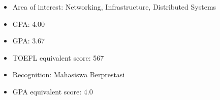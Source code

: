 \begin{itemize}
  \item Area of interest: Networking, Infrastructure, Distributed Systems
  \item GPA: 4.00
\end{itemize}

\begin{itemize}
  \item GPA: 3.67
  \item TOEFL equivalent score: 567
  \item Recognition: Mahasiswa Berprestasi
\end{itemize}

\begin{itemize}
  \item GPA equivalent score: 4.0
\end{itemize}
